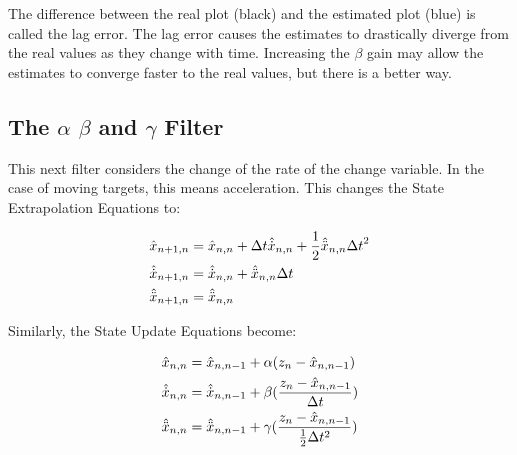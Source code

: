 

        The difference between the real plot (black) and the estimated plot (blue) is called the lag error.
        The lag error causes the estimates to drastically diverge from the real values as they change with time.
        Increasing the $\beta$ gain may allow the estimates to converge faster to the real values, but there is a better way.

        \subsection{The $\alpha$ $\beta$ and $\gamma$ Filter}
        This next filter considers the change of the rate of the change variable. 
        In the case of moving targets, this means acceleration.
        This changes the State Extrapolation Equations to:

        \begin{subequations}
            \labeq{see_dynamic_model_2}
            \begin{align}
                \hat{x}_{n+1,n} &= \hat{x}_{n,n} + \Delta t \hat{\dot{x}}_{n,n} + \frac{1}{2} \hat{\ddot{x}}_{n,n} {\Delta t}^2 \labeq{see_disp_2}\\
                \hat{\dot{x}}_{n+1,n} &= \hat{\dot{x}}_{n,n} + \hat{\ddot{x}}_{n,n} \Delta t \labeq{see_velocity_2} \\
                \hat{\ddot{x}}_{n+1,n} &= \hat{\ddot{x}}_{n,n}
            \end{align}
        \end{subequations}

        Similarly, the State Update Equations become:

        \begin{subequations}
            \labeq{sue_abg}
            \begin{align}
                \hat{x}_{n,n} &= \hat{x}_{n,n-1} + \alpha (z_n - \hat{x}_{n,n-1}) \labeq{sue_abg_disp}\\
                \hat{\dot{x}}_{n,n} &= \hat{\dot{x}}_{n,n-1} + \beta (\frac{z_n - \hat{x}_{n,n-1}}{\Delta t}) \labeq{sue_abg_velocity} \\
                \hat{\ddot{x}}_{n,n} &= \hat{\ddot{x}}_{n,n-1} + \gamma (\frac{z_n - \hat{x}_{n,n-1}}{\frac{1}{2} \Delta t^2}) \labeq{sue_abg_accel}
            \end{align}
        \end{subequations}

